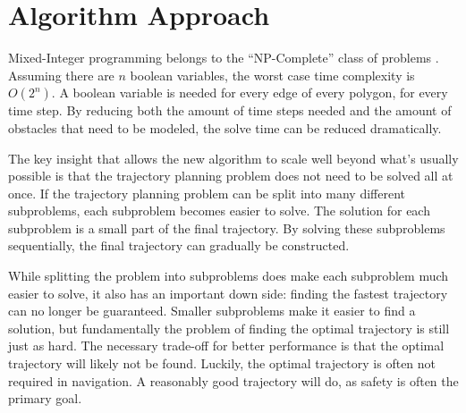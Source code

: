 \section{Algorithm Approach}
Mixed-Integer programming belongs to the ``NP-Complete'' class of problems \cite{DBLP:conf/coco/Karp72}. Assuming there are $n$ boolean variables, the worst case time complexity is $O(2^n)$. A boolean variable is needed for every edge of every polygon, for every time step. By reducing both the amount of time steps needed and the amount of obstacles that need to be modeled, the solve time can be reduced dramatically.
\par
The key insight that allows the new algorithm to scale well beyond what's usually possible is that the trajectory planning problem does not need to be solved all at once. If the trajectory planning problem can be split into many different subproblems, each subproblem becomes easier to solve. The solution for each subproblem is a small part of the final trajectory. By solving these subproblems sequentially, the final trajectory can gradually be constructed.
\par
While splitting the problem into subproblems does make each subproblem much easier to solve, it also has an important down side: finding the fastest trajectory can no longer be guaranteed. Smaller subproblems make it easier to find a solution, but fundamentally the problem of finding the optimal trajectory is still just as hard. The necessary trade-off for better performance is that the optimal trajectory will likely not be found. Luckily, the optimal trajectory is often not required in navigation. A reasonably good trajectory will do, as safety is often the primary goal.

